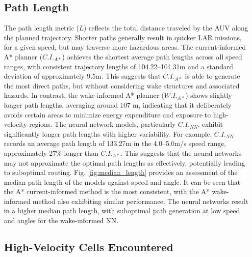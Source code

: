 \documentclass[final,5p,times,twocolumn]{elsarticle}
\begin{document}
\subsection{Path Length} %

The path length metric ($L$) reflects the total distance traveled by the AUV along the planned trajectory. Shorter paths generally result in quicker LAR missions, for a given speed, but may traverse more hazardous areas. The current-informed A* planner ($C.I._{A*}$) achieves the shortest average path lengths across all speed ranges, with consistent trajectory lengths of  104.22--104.31m and a standard deviation of approximately 9.5m. This suggests that $C.I._{A*}$ is able to generate the most direct paths, but without considering wake structures and associated hazards. In contrast, the wake-informed A* planner ($W.I._{A*}$) shows slightly longer path lengths, averaging around 107 m, indicating that it deliberately avoids certain areas to minimize energy expenditure and exposure to high-velocity regions. The neural network models, particularly $C.I._{NN}$, exhibit significantly longer path lengths with higher variability. For example, $C.I._{NN}$ records an average path length of 133.27m in the 4.0--5.0m/s speed range, approximately 27\% longer than $C.I._{A*}$. This suggests that the neural networks may not approximate the optimal path lengths as effectively, potentially leading to suboptimal routing. Fig. \ref{fig:median_length} provides an assessment of the median path length of the models against speed and angle. It can be seen that the A* current-informed method is the most consistent, with the A* wake-informed method also exhibiting similar performance. The neural networks result in a higher median path length, with suboptimal path generation at low speed and angles for the wake-informed NN.

\subsection{High-Velocity Cells Encountered} %
\end{document}
